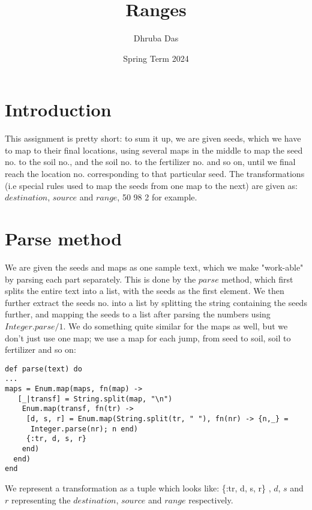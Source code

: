 \documentclass[a4paper,11pt]{article}
\begin{document}
\title{
    \textbf{Ranges}
}
\author{Dhruba Das}
\date{Spring Term 2024}

\maketitle

\section*{Introduction}
This assignment is pretty short: to sum it up, we are given seeds, which we have to map to their final locations, using several maps in the middle to map the seed no. to the soil no., and the soil no. to the fertilizer no. and so on, until we final reach the location no. corresponding to that particular seed. The transformations (i.e special rules used to map the seeds from one map to the next) are given as: $destination$, $source$ and $range$, 50 98 2 for example.

\section*{Parse method}
We are given the seeds and maps as one sample text, which we make "work-able" by parsing each part separately. This is done by the $parse$ method, which first splits the entire text into a list, with the seeds as the first element. We then further extract the seeds no. into a list by splitting the string containing the seeds further, and mapping the seeds to a list after parsing the numbers using $Integer.parse/1$. We do something quite similar for the maps as well, but we don't just use one map; we use a map for each jump, from seed to soil, soil to fertilizer and so on:
\begin{verbatim}
def parse(text) do
...
maps = Enum.map(maps, fn(map) ->
   [_|transf] = String.split(map, "\n")
    Enum.map(transf, fn(tr) ->
     [d, s, r] = Enum.map(String.split(tr, " "), fn(nr) -> {n,_} = 
      Integer.parse(nr); n end)
     {:tr, d, s, r}
    end)
  end)
end
\end{verbatim}
We represent a transformation as a tuple which looks like: \{:tr, d, s, r\} , $d$, $s$ and $r$ representing the $destination$, $source$ and $range$ respectively.
\end{document}
